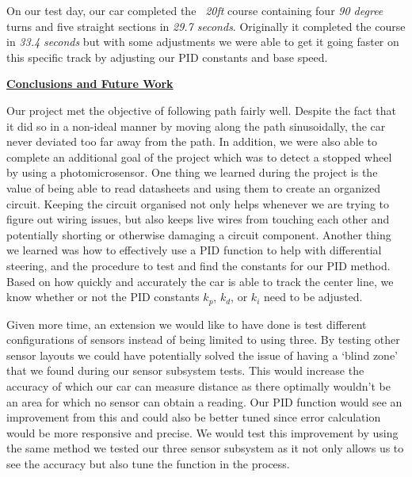 \documentclass[twocolumn]{article}
\newcommand{\sectionTitle}[1]{ {\large\textbf{\uline{#1}}} \\ \vspace{1.5em} }
\begin{document}
\begin{flushleft}
		\hspace{1em}On our test day, our car completed the \textit{~20ft} course containing four \textit{90 degree} turns and five straight sections in \textit{29.7 seconds}. Originally it completed the course in \textit{33.4 seconds} but with some adjustments we were able to get it going faster on this specific track by adjusting our PID constants and base speed. \\ \vspace{1em}
			
		\sectionTitle{Conclusions and Future Work}
			
		\hspace{1em}Our project met the objective of following path fairly well. Despite the fact that it did so in a non-ideal manner by moving along the path sinusoidally, the car never deviated too far away from the path. In addition, we were also able to complete an additional goal of the project which was to detect a stopped wheel by using a photomicrosensor. One thing we learned during the project is the value of being able to read datasheets and using them to create an organized circuit. Keeping the circuit organised not only helps whenever we are trying to figure out wiring issues, but also keeps live wires from touching each other and potentially shorting or otherwise damaging a circuit component. Another thing we learned was how to effectively use a PID function to help with differential steering, and the procedure to test and find the constants for our PID method. Based on how quickly and accurately the car is able to track the center line, we know whether or not the PID constants $k_p$, $k_d$, or $k_i$ need to be adjusted. \\ \vspace{1em}
		
		\hspace{1em}Given more time, an extension we would like to have done is test different configurations of sensors instead of being limited to using three. By testing other sensor layouts we could have potentially solved the issue of having a `blind zone’ that we found during our sensor subsystem tests. This would increase the accuracy of which our car can measure distance as there optimally wouldn’t be an area for which no sensor can obtain a reading. Our PID function would see an improvement from this and could also be better tuned since error calculation would be more responsive and precise. We would test this improvement by using the same method we tested our three sensor subsystem as it not only allows us to see the accuracy but also tune the function in the process. \\ \vspace{-54em}


\end{flushleft}
\end{document}
